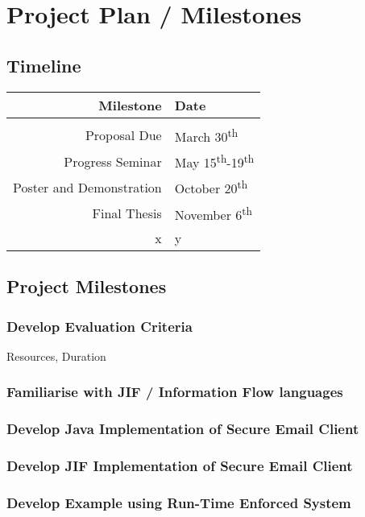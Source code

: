 \section{Project Plan / Milestones}

\subsection{Timeline}

\begin{tabular}{r|l}
	Milestone & Date \\\hline\\
	Proposal Due & March 30\textsuperscript{th} \\
	Progress Seminar & May 15\textsuperscript{th}-19\textsuperscript{th} \\
	Poster and Demonstration & October 20\textsuperscript{th} \\
	Final Thesis & November 6\textsuperscript{th} \\
	x & y \\
\end{tabular}

\subsection{Project Milestones}

\subsubsection{Develop Evaluation Criteria}
Resources, Duration

\subsubsection{Familiarise with JIF / Information Flow languages}

\subsubsection{Develop Java Implementation of Secure Email Client}

\subsubsection{Develop JIF Implementation of Secure Email Client}

\subsubsection{Develop Example using Run-Time Enforced System}

